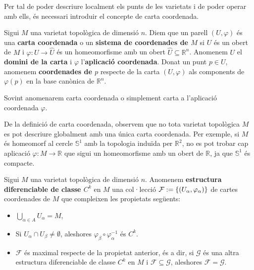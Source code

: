 Per tal de poder descriure localment els punts de les varietats i de poder operar amb ells, és necessari introduir el concepte de carta coordenada. 

\begin{defi}
    Sigui $M$ una varietat topològica de dimensió $n$. Diem que un parell $(U,\varphi)$ és una \textbf{carta coordenada} o un \textbf{sistema de coordenades de $M$} si $U$ és un obert de $M$ i $\varphi:U\to\hat U$ és un homeomorfisme amb un obert $\hat U\subseteq\mathbb R^n$. Anomenem $U$ el \textbf{domini de la carta} i $\varphi$ l'\textbf{aplicació coordenada}. Donat un punt $p\in U$, anomenem \textbf{coordenades de $p$} respecte de la carta $(U,\varphi)$ als components de $\varphi(p)$ en la base canònica de $\mathbb R^n$.
\end{defi}
\begin{nota}
    Sovint anomenarem carta coordenada o simplement carta a l'aplicació coordenada $\varphi$.
\end{nota}

\begin{obs}
    De la definició de carta coordenada, observem que no tota varietat topològica $M$ es pot descriure globalment amb una única carta coordenada. Per exemple, si $M$ és homeomorf al cercle $\mathbb S^1$ amb la topologia induïda per $\mathbb R^2$, no es pot trobar cap aplicació $\varphi:M\to\mathbb R$ que sigui un homeomorfisme amb un obert de $\mathbb R$, ja que $\mathbb S^1$ és compacte.
\end{obs}

\begin{defi}
    Sigui $M$ una varietat topològica de dimensió $n$. Anomenem \textbf{estructura diferenciable de classe $C^k$} en $M$ una col·lecció $\mathcal F:=\{(U_\alpha,\varphi_\alpha)\}$ de cartes coordenades de $M$ que compleixen les propietats següents:
    \begin{itemize}
        \item $\bigcup_{\alpha\in A} U_\alpha = M$,
        \item Si $U_\alpha\cap U_\beta\neq\emptyset$, aleshores $\varphi_\beta\circ\varphi_\alpha^{-1}$ és $C^k$.
        \item $\mathcal F$ és maximal respecte de la propietat anterior, és a dir, si $\mathcal G$ és una altra estructura diferenciable de classe $C^k$ en $M$ i $\mathcal F\subseteq\mathcal G$, aleshores $\mathcal F = \mathcal G$.
    \end{itemize}
\end{defi}

